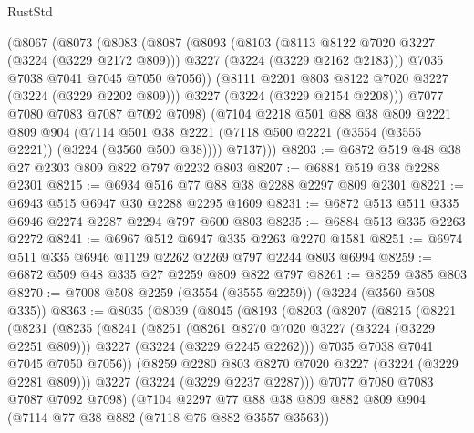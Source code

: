 \begin{lexlean}{RustStd}
\begin{coremodule}
      (@8067
        (@8073
          (@8083
            (@8087
              (@8093
                (@8103
                  (@8113 @8122 @7020 @3227 (@3224 (@3229 @2172 @809)))
                  @3227
                  (@3224 (@3229 @2162 @2183)))
                @7035
                @7038
                @7041
                @7045
                @7050
                @7056))
            (@8111 @2201 @803 @8122 @7020 @3227 (@3224 (@3229 @2202 @809)))
            @3227
            (@3224 (@3229 @2154 @2208)))
          @7077
          @7080
          @7083
          @7087
          @7092
          @7098)
        (@7104
          @2218
          @501
          @88
          @38
          @809
          @2221
          @809
          @904
          (@7114 @501 @38 @2221 (@7118 @500 @2221 (@3554 (@3555 @2221)) (@3224 (@3560 @500 @38))))
          @7137)))
@8203 := @6872 @519 @48 @38 @27 @2303 @809 @822 @797 @2232 @803
@8207 := @6884 @519 @38 @2288 @2301
@8215 := @6934 @516 @77 @88 @38 @2288 @2297 @809 @2301
@8221 := @6943 @515 @6947 @30 @2288 @2295 @1609
@8231 := @6872 @513 @511 @335 @6946 @2274 @2287 @2294 @797 @600 @803
@8235 := @6884 @513 @335 @2263 @2272
@8241 := @6967 @512 @6947 @335 @2263 @2270 @1581
@8251 := @6974 @511 @335 @6946 @1129 @2262 @2269 @797 @2244 @803 @6994
@8259 := @6872 @509 @48 @335 @27 @2259 @809 @822 @797
@8261 := @8259 @385 @803
@8270 := @7008 @508 @2259 (@3554 (@3555 @2259)) (@3224 (@3560 @508 @335))
@8363 := @8035
    (@8039
      (@8045
        (@8193
          (@8203
            (@8207
              (@8215
                (@8221
                  (@8231
                    (@8235
                      (@8241
                        (@8251
                          (@8261 @8270 @7020 @3227 (@3224 (@3229 @2251 @809)))
                          @3227
                          (@3224 (@3229 @2245 @2262)))
                        @7035
                        @7038
                        @7041
                        @7045
                        @7050
                        @7056))
                    (@8259 @2280 @803 @8270 @7020 @3227 (@3224 (@3229 @2281 @809)))
                    @3227
                    (@3224 (@3229 @2237 @2287)))
                  @7077
                  @7080
                  @7083
                  @7087
                  @7092
                  @7098)
                (@7104
                  @2297
                  @77
                  @88
                  @38
                  @809
                  @882
                  @809
                  @904
                  (@7114 @77 @38 @882 (@7118 @76 @882 @3557 @3563))

\end{coremodule}
\end{lexlean}
